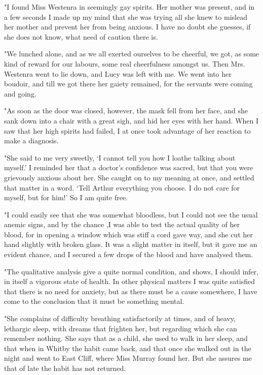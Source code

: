 "I found Miss Westenra in seemingly gay spirits. Her mother was present, and in a few seconds I made up my mind that she was trying all she knew to mislead her mother and prevent her from being anxious. I have no doubt she guesses, if she does not know, what need of caution there is. 

"We lunched alone, and as we all exerted ourselves to be cheerful, we got, as some kind of reward for our labours, some real cheerfulness amongst us. Then Mrs. Westenra went to lie down, and Lucy was left with me. We went into her boudoir, and till we got there her gaiety remained, for the servants were coming and going. 

"As soon as the door was closed, however, the mask fell from her face, and she sank down into a chair with a great sigh, and hid her eyes with her hand. When I saw that her high spirits had failed, I at once took advantage of her reaction to make a diagnosis. 

"She said to me very sweetly, `I cannot tell you how I loathe talking about myself.' I reminded her that a doctor's confidence was sacred, but that you were grievously anxious about her. She caught on to my meaning at once, and settled that matter in a word. `Tell Arthur everything you choose. I do not care for myself, but for him!' So I am quite free. 

"I could easily see that she was somewhat bloodless, but I could not see the usual anemic signs, and by the chance ,I was able to test the actual quality of her blood, for in opening a window which was stiff a cord gave way, and she cut her hand slightly with broken glass. It was a slight matter in itself, but it gave me an evident chance, and I secured a few drops of the blood and have analysed them. 

"The qualitative analysis give a quite normal condition, and shows, I should infer, in itself a vigorous state of health. In other physical matters I was quite satisfied that there is no need for anxiety, but as there must be a cause somewhere, I have come to the conclusion that it must be something mental. 

"She complains of difficulty breathing satisfactorily at times, and of heavy, lethargic sleep, with dreams that frighten her, but regarding which she can remember nothing. She says that as a child, she used to walk in her sleep, and that when in Whitby the habit came back, and that once she walked out in the night and went to East Cliff, where Miss Murray found her. But she assures me that of late the habit has not returned. 

